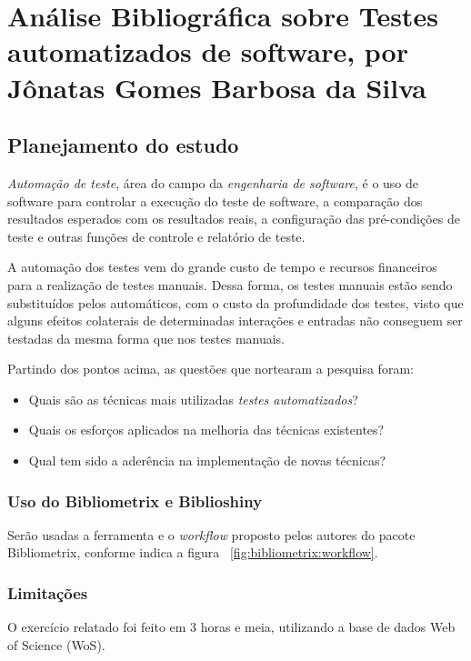 \chapter{Análise Bibliográfica sobre Testes automatizados de software, por Jônatas Gomes Barbosa da Silva\label{chap:bibliometria:titofrota}}

\section{Planejamento do estudo}

\textit{Automação de teste}, área do campo da \textit{engenharia de software}, é o uso de software para controlar a execução do teste de software, a comparação dos resultados esperados com os resultados reais, a configuração das pré-condições de teste e outras funções de controle e relatório de teste. 

A automação dos testes vem do grande custo de tempo e recursos financeiros para a realização de testes manuais. Dessa forma, os testes manuais estão sendo substituídos pelos automáticos, com o custo da profundidade dos testes, visto que alguns efeitos colaterais de determinadas interações e entradas não conseguem ser testadas da mesma forma que nos testes manuais.

Partindo dos pontos acima, as questões que nortearam a pesquisa foram:
\begin{itemize}
    \item Quais são as técnicas mais utilizadas \textit{testes automatizados}?
    \item Quais os esforços aplicados na melhoria das técnicas existentes?
    \item Qual tem sido a aderência na implementação de novas técnicas?
\end{itemize}

\subsection{Uso do Bibliometrix e Biblioshiny}
Serão usadas a ferramenta e o \textit{workflow} proposto pelos autores do pacote Bibliometrix, conforme indica a figura ~\ref{fig:bibliometrix:workflow}.

\subsection{Limitações} O exercício relatado foi feito em 3 horas e meia, utilizando a base de dados Web of Science (WoS).


